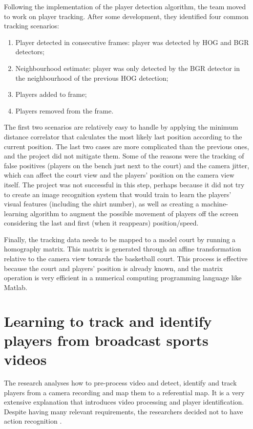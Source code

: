 \documentclass[
    11pt,
    oneside
]{report}
\begin{document}
Following the implementation of the player detection algorithm, the team moved to work on player tracking. After some development, they identified four common tracking scenarios:
\begin{enumerate}
    \item Player detected in consecutive frames: player was detected by HOG and BGR detectors;
    \item Neighbourhood estimate: player was only detected by the BGR detector in the neighbourhood of the previous HOG detection;
    \item Players added to frame;
    \item Players removed from the frame.
\end{enumerate}
The first two scenarios are relatively easy to handle by applying the minimum distance correlator that calculates the most likely last position according to the current position. The last two cases are more complicated than the previous ones, and the project did not mitigate them. Some of the reasons were the tracking of false positives (players on the bench just next to the court) and the camera jitter, which can affect the court view and the players' position on the camera view itself. The project \cite{baskettrack} was not successful in this step, perhaps because it did not try to create an image recognition system that would train to learn the players' visual features (including the shirt number), as well as creating a machine-learning algorithm to augment the possible movement of players off the screen considering the last and first (when it reappears) position/speed.


Finally, the tracking data needs to be mapped to a model court by running a homography matrix. This matrix is generated through an affine transformation relative to the camera view towards the basketball court. This process is effective because the court and players' position is already known, and the matrix operation is very efficient in a numerical computing programming language like Matlab.



\section{Learning to track and identify players from broadcast sports videos}


The research analyses how to pre-process video and detect, identify and track players from a camera recording and map them to a referential map. It is a very extensive explanation that introduces video processing and player identification. Despite having many relevant requirements, the researchers decided not to have action recognition \cite{learn_track_id}.
\end{document}
